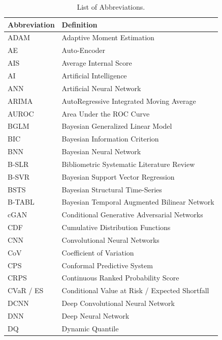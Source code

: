 \begin{table}[H]
    \centering
    \caption[List of Abbreviations]{List of Abbreviations.}
    \label{table:abbreviations}
    \small
    \begin{subtable}[t]{0.49\textwidth}
        \centering
        \begin{tabular}{lp{}}
        \toprule
        \textbf{Abbreviation} & \textbf{Definition} \\
        \midrule
        ADAM & Adaptive Moment Estimation \\
        AE & Auto-Encoder \\
        AIS & Average Internal Score \\
        AI & Artificial Intelligence \\
        ANN & Artificial Neural Network \\
        ARIMA & AutoRegressive Integrated Moving Average \\
        AUROC & Area Under the ROC Curve \\
        BGLM & Bayesian Generalized Linear Model \\
        BIC & Bayesian Information Criterion \\
        BNN & Bayesian Neural Network \\
        B-SLR & Bibliometric Systematic Literature Review \\
        B-SVR & Bayesian Support Vector Regression \\
        BSTS & Bayesian Structural Time-Series \\
        B-TABL & Bayesian Temporal Augmented Bilinear Network \\
        cGAN & Conditional Generative Adversarial Networks \\
        CDF & Cumulative Distribution Functions \\
        CNN & Convolutional Neural Networks \\
        CoV & Coefficient of Variation \\
        CPS & Conformal Predictive System \\
        CRPS & Continuous Ranked Probability Score \\
        CVaR / ES & Conditional Value at Risk / Expected Shortfall \\
        DCNN & Deep Convolutional Neural Network \\
        DNN & Deep Neural Network \\
        DQ & Dynamic Quantile \\

\end{tabular}
\end{subtable}
\end{table}
